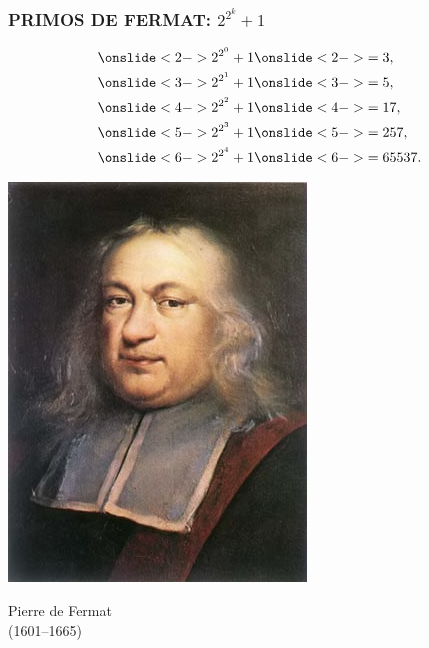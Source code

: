 \begin{frame}
  \frametitle{PRIMOS DE FERMAT: $2^{2^k} + 1$}

  \begin{minipage}[t][0.6\textheight]{0.6\textwidth}
    \begin{align*}
      \onslide<2->{2^{2^0} + 1} & \onslide<2->{= 3,} \\
      \onslide<3->{2^{2^1} + 1} & \onslide<3->{= 5,} \\
      \onslide<4->{2^{2^2} + 1} & \onslide<4->{= 17,} \\
      \onslide<5->{2^{2^3} + 1} & \onslide<5->{= 257,} \\
      \onslide<6->{2^{2^4} + 1} & \onslide<6->{= 65537.} \\
    \end{align*}
  \end{minipage}
  \begin{minipage}[t]{0.35\textwidth}
    \vspace{0pt}\flushright
    \includegraphics[width=.9\textwidth]{fermat.jpg}

    Pierre de Fermat\\
    (1601--1665)
  \end{minipage}
\end{frame}

